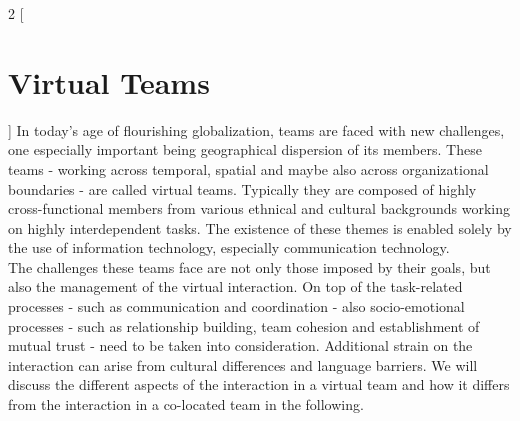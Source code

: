 \begin{multicols}{2}
[\section{Virtual Teams}]
In today's age of flourishing globalization, teams are faced with new challenges, one especially important being geographical dispersion of its members. These teams - working across temporal, spatial and maybe also across organizational boundaries - are called virtual teams. Typically they are composed of highly cross-functional members from various ethnical and cultural backgrounds working on highly interdependent tasks. The existence of these themes is enabled solely by the use of information technology, especially communication technology.\\
The challenges these teams face are not only those imposed by their goals, but also the management of the virtual interaction. On top of the task-related processes - such as communication and coordination - also socio-emotional processes - such as relationship building, team cohesion and establishment of mutual trust - need to be taken into consideration.\cite{Powell_Piccoli_Ives_2004} Additional strain on the interaction can arise from cultural differences and language barriers. We will discuss the different aspects of the interaction in a virtual team and how it differs from the interaction in a co-located team in the following.
\end{multicols}